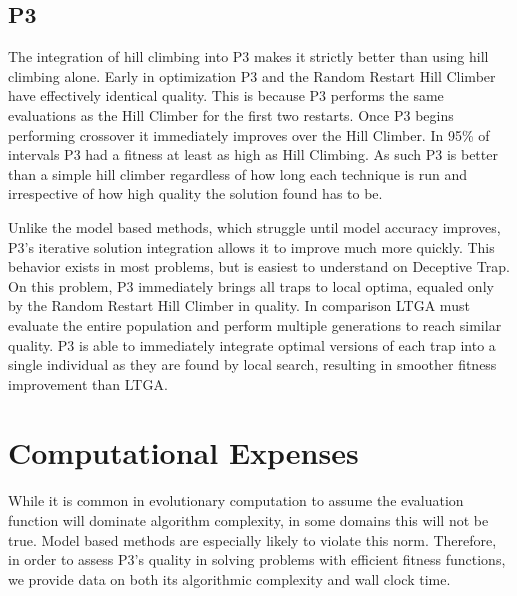 \documentclass[twoside]{article}
\begin{document}
\subsection{P3}
The integration of hill climbing into P3 makes it strictly better than using hill climbing alone.
Early in optimization P3 and the Random Restart Hill Climber have effectively identical quality. This is because
P3 performs the same evaluations as the Hill Climber for the first two restarts. Once P3 begins
performing crossover it immediately improves over the Hill Climber. In 95\% of intervals P3 had a fitness at
least as high as Hill Climbing. As such P3 is better than a simple
hill climber regardless of how long each technique is run and irrespective of how high quality the solution
found has to be.

Unlike the model based methods, which struggle until model accuracy improves, P3's iterative solution
integration allows it to improve much more quickly. This behavior exists in most problems, but is easiest to understand on Deceptive Trap.
On this problem, P3 immediately brings all traps to local optima, equaled only by the Random Restart Hill Climber in quality.
In comparison LTGA must evaluate the entire population and perform multiple generations to reach similar quality.
P3 is able to immediately integrate optimal versions of each
trap into a single individual as they are found by local search, resulting in smoother fitness improvement than LTGA.

\section{Computational Expenses}
While it is common in evolutionary computation to assume the evaluation function will dominate algorithm
complexity, in some domains this will not be true. Model based methods are especially likely to violate
this norm. Therefore, in order to assess P3's quality in solving problems with efficient fitness functions,
we provide data on both its algorithmic complexity and wall clock time.
\end{document}
